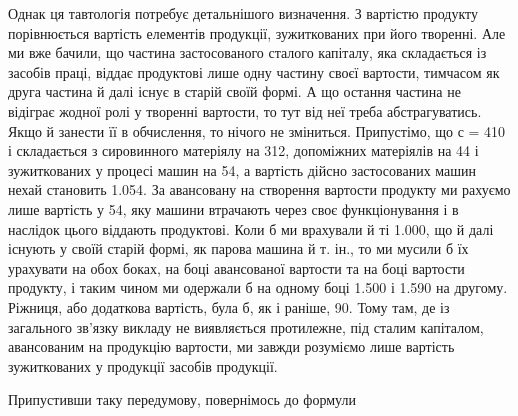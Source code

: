 Однак ця тавтологія потребує детальнішого визначення. З вартістю продукту порівнюється вартість
елементів продукції, зужиткованих при його творенні. Але ми вже бачили, що частина застосованого
сталого капіталу, яка складається із засобів праці, віддає продуктові лише одну частину своєї
вартости, тимчасом як друга частина й далі існує в старій своїй формі. А що остання частина не
відіграє жодної ролі у творенні вартости, то тут від неї треба абстрагуватись. Якщо й занести її в
обчислення, то нічого не зміниться. Припустімо, що с = 410 і
складається з сировинного матеріялу на 312, допоміжних матеріялів на 44 і зужиткованих
у процесі машин на 54, а вартість дійсно застосованих машин нехай становить 1.054. За авансовану на створення вартости продукту ми рахуємо лише вартість у 54, яку машини втрачають через своє функціонування і в наслідок цього віддають продуктові.
Коли б ми врахували
й ті 1.000, що й далі існують у своїй старій формі, як парова машина й т. ін., то
ми мусили б їх урахувати
на обох боках, на боці авансованої вартости та на боці вартости продукту, і таким чином ми
одержали б на одному боці
1.500 і 1.590 на другому. Ріжниця, або додаткова вартість, була
б, як і раніше, 90. Тому там, де із загального зв’язку викладу не виявляється
протилежне, під сталим капіталом, авансованим на продукцію
вартости, ми завжди розуміємо лише вартість зужиткованих
у продукції засобів продукції.

Припустивши таку передумову, повернімось до формули

